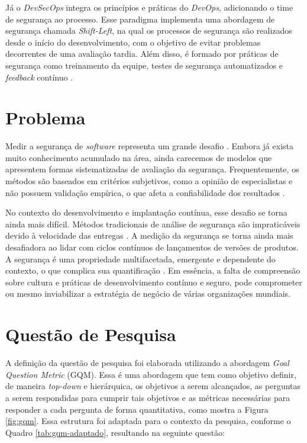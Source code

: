 Já o \textit{DevSecOps} integra os princípios e práticas do \textit{DevOps}, adicionando o time de segurança ao processo. Esse paradigma implementa uma abordagem de segurança chamada \textit{Shift-Left}, na qual os processos de segurança são realizados desde o início do desenvolvimento, com o objetivo de evitar problemas decorrentes de uma avaliação tardia. Além disso, é formado por práticas de segurança como treinamento da equipe, testes de segurança automatizados e \textit{feedback} contínuo \cite{Rajapakse2022}.

\section{Problema}

Medir a segurança de \textit{software} representa um grande desafio \cite{Rajapakse2022}. Embora já exista muito conhecimento acumulado na área, ainda carecemos de modelos que apresentem formas sistematizadas de avaliação da segurança. Frequentemente, os métodos são baseados em critérios subjetivos, como a opinião de especialistas e não possuem validação empírica, o que afeta a confiabilidade dos resultados \cite{Siavvas21}.

No contexto do desenvolvimento e implantação contínua, esse desafio se torna ainda mais difícil. Métodos tradicionais de análise de segurança são impraticáveis devido à velocidade das entregas \cite{Rajapakse2022}. A medição da segurança se torna ainda mais desafiadora ao lidar com ciclos contínuos de lançamentos de versões de produtos. A segurança é uma propriedade multifacetada, emergente e dependente do contexto, o que complica sua quantificação \cite{Kudriavtseva20241223}.
Em essência, a falta de compreensão sobre cultura e práticas de desenvolvimento contínuo e seguro, pode comprometer ou mesmo inviabilizar a estratégia de negócio de várias organizações mundiais.

\section{Questão de Pesquisa}
\label{sec:qp_principal}

A definição da questão de pesquisa foi elaborada utilizando a abordagem \textit{Goal Question Metric} (GQM). Essa é uma abordagem que tem como objetivo definir, de maneira \textit{top-down} e hierárquica, os objetivos a serem alcançados, as perguntas a serem respondidas para cumprir tais objetivos e as métricas necessárias para responder a cada pergunta de forma quantitativa, como mostra a Figura \ref{fig:gqm}. Essa estrutura foi adaptada para o contexto da pesquisa, conforme o Quadro \ref{tab:gqm-adaptado}, resultando na seguinte questão:

